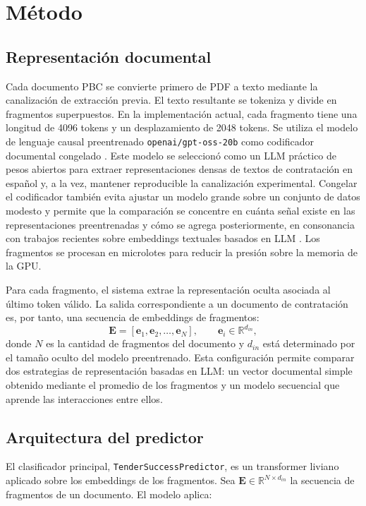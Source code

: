 \chapter{Método}
\section{Representación documental}
Cada documento PBC se convierte primero de PDF a texto mediante la canalización de extracción previa. El texto resultante se tokeniza y divide en fragmentos superpuestos. En la implementación actual, cada fragmento tiene una longitud de 4096 tokens y un desplazamiento de 2048 tokens. Se utiliza el modelo de lenguaje causal preentrenado \texttt{openai/gpt-oss-20b} como codificador documental congelado \cite{agarwal2025gptoss}. Este modelo se seleccionó como un LLM práctico de pesos abiertos para extraer representaciones densas de textos de contratación en español y, a la vez, mantener reproducible la canalización experimental. Congelar el codificador también evita ajustar un modelo grande sobre un conjunto de datos modesto y permite que la comparación se concentre en cuánta señal existe en las representaciones preentrenadas y cómo se agrega posteriormente, en consonancia con trabajos recientes sobre embeddings textuales basados en LLM \cite{wang2024improvingembeddings}. Los fragmentos se procesan en microlotes para reducir la presión sobre la memoria de la GPU.

Para cada fragmento, el sistema extrae la representación oculta asociada al último token válido. La salida correspondiente a un documento de contratación es, por tanto, una secuencia de embeddings de fragmentos:
\[
\mathbf{E} = [\mathbf{e}_1, \mathbf{e}_2, \dots, \mathbf{e}_N], \qquad \mathbf{e}_i \in \mathbb{R}^{d_{in}},
\]
donde $N$ es la cantidad de fragmentos del documento y $d_{in}$ está determinado por el tamaño oculto del modelo preentrenado. Esta configuración permite comparar dos estrategias de representación basadas en LLM: un vector documental simple obtenido mediante el promedio de los fragmentos y un modelo secuencial que aprende las interacciones entre ellos.

\section{Arquitectura del predictor}
El clasificador principal, \texttt{TenderSuccessPredictor}, es un transformer liviano aplicado sobre los embeddings de los fragmentos. Sea $\mathbf{E} \in \mathbb{R}^{N \times d_{in}}$ la secuencia de fragmentos de un documento. El modelo aplica:

